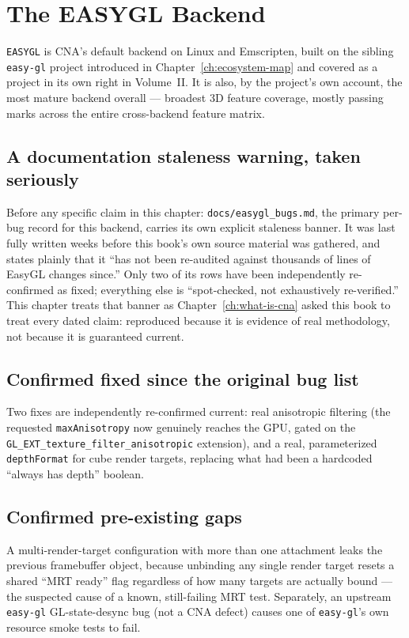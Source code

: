 \chapter{The EASYGL Backend}
\label{ch:easygl-backend}

\texttt{EASYGL} is CNA's default backend on Linux and Emscripten, built on the sibling
\texttt{easy-gl} project introduced in Chapter~\ref{ch:ecosystem-map} and covered as a
project in its own right in Volume~II. It is also, by the project's own account, the most
mature backend overall --- broadest 3D feature coverage, mostly passing marks across the
entire cross-backend feature matrix.

\section{A documentation staleness warning, taken seriously}

Before any specific claim in this chapter: \texttt{docs/easygl\_bugs.md}, the primary
per-bug record for this backend, carries its own explicit staleness banner. It was last
fully written weeks before this book's own source material was gathered, and states plainly
that it ``has not been re-audited against thousands of lines of EasyGL changes since.'' Only
two of its rows have been independently re-confirmed as fixed; everything else is
``spot-checked, not exhaustively re-verified.'' This chapter treats that banner as
Chapter~\ref{ch:what-is-cna} asked this book to treat every dated claim: reproduced because
it is evidence of real methodology, not because it is guaranteed current.

\section{Confirmed fixed since the original bug list}

Two fixes are independently re-confirmed current: real anisotropic filtering (the requested
\texttt{maxAnisotropy} now genuinely reaches the GPU, gated on the
\texttt{GL\_EXT\_texture\_filter\_anisotropic} extension), and a real, parameterized
\texttt{depthFormat} for cube render targets, replacing what had been a hardcoded
``always has depth'' boolean.

\section{Confirmed pre-existing gaps}

A multi-render-target configuration with more than one attachment leaks the previous
framebuffer object, because unbinding any single render target resets a shared ``MRT ready''
flag regardless of how many targets are actually bound --- the suspected cause of a known,
still-failing MRT test. Separately, an upstream \texttt{easy-gl} GL-state-desync bug (not a
CNA defect) causes one of \texttt{easy-gl}'s own resource smoke tests to fail.

